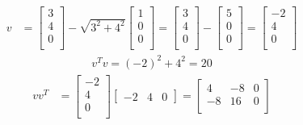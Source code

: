 \documentclass{article}
\begin{document}
\begin{enumerate}
\begin{enumerate}
  {
  \everymath{\displaystyle}
      \begin{align*}
          v &= 
          \begin{bmatrix}
            3 \\
            4 \\
            0 \\
          \end{bmatrix}
          - \sqrt{3^2 + 4^2}
          \begin{bmatrix}
            1 \\
            0 \\
            0 \\
          \end{bmatrix}
          = 
          \begin{bmatrix}
            3 \\
            4 \\
            0 \\
          \end{bmatrix}
          - 
          \begin{bmatrix}
            5 \\
            0 \\
            0 \\
          \end{bmatrix}
          = 
          \begin{bmatrix}
            -2 \\
            4 \\
            0 \\
          \end{bmatrix}
      \end{align*}
      \begin{align*}
          v^Tv = (-2)^2 + 4^2 = 20
      \end{align*}
      \begin{align*}
          vv^T &= 
          \begin{bmatrix}
            -2 \\
            4 \\
            0 \\
          \end{bmatrix}
          \begin{bmatrix}
            -2 & 4 & 0 
          \end{bmatrix} 
          = 
          \begin{bmatrix}
            4 & -8 & 0 \\
            -8 & 16 & 0 \\

\end{bmatrix}
\end{align*}}
\end{enumerate}
\end{enumerate}
\end{document}
